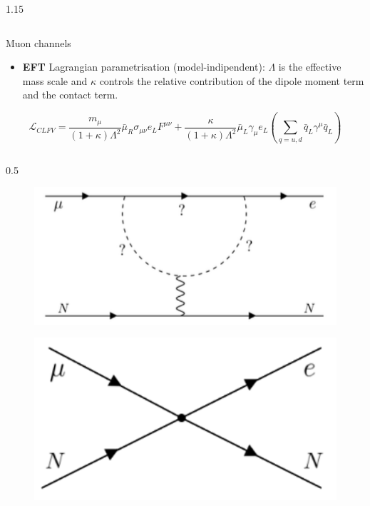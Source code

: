 \documentclass{beamer}
\begin{document}
\begin{frame}
\begin{columns}
\begin{column}{1.15\framewidth}
\begin{itemize}
\begin{itemize}
{        }
       \end{itemize}
        \end{itemize}
    \end{column}
\end{columns}
\end{frame}
\begin{frame}{Muon channels}
    \vspace{-1mm}
    \setlength{\leftmargini}{0em}
    \begin{itemize}
    \item \textbf{EFT} Lagrangian parametrisation (model-indipendent): $\Lambda$ is the effective mass scale and $\kappa$ controls the relative contribution of the dipole moment term and the contact term.
    \end{itemize}
    \begin{equation*}\label{LCF}
    \mathcal{L}_{C L F V}=  \frac{m_\mu}{(1+\kappa) \Lambda^2} \bar{\mu}_R \sigma_{\mu \nu} e_L F^{\mu \nu}+ \frac{\kappa}{(1+\kappa) \Lambda^2} \bar{\mu}_L \gamma_\mu e_L\left(\sum_{q=u, d} \bar{q}_L \gamma^\mu \bar{q}_L\right)
    \end{equation*}
    \vspace{-3mm}
    \begin{columns}
    \begin{column}{0.5\framewidth}
                    \begin{figure}[h]
                \centering
                \hspace*{-6ex}
                \includegraphics[width=0.8\columnwidth]{figures/png/Screenshot_20240913_151711.png}
            \end{figure} 
            \begin{figure}[h]
                \centering
                \hspace*{-6ex}
                \includegraphics[width=0.8\columnwidth]{figures/png/Screenshot_20240913_151719.png}

\end{figure}
\end{column}
\end{columns}
\end{frame}
\end{document}
